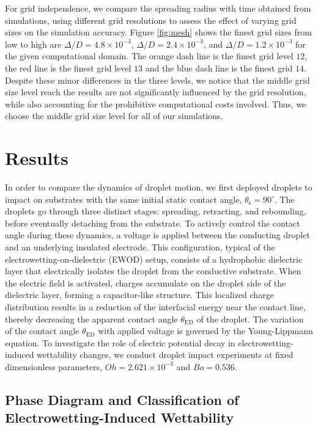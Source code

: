 \documentclass[lineno]{cls/jfm}
\begin{document}
For grid independence, we compare the spreading radius with time obtained from simulations, using different grid resolutions to assess the effect of varying grid sizes on the simulation accuracy. Figure \ref{fig:mesh} shows the finest grid sizes from low to high are $\Delta/D = 4.8 \times 10^{-3}$, $\Delta/D = 2.4 \times 10^{-3}$, and $\Delta/D = 1.2 \times 10^{-3}$ for the given computational domain. The orange dash line is the finest grid level $12$, the red line is the finest grid level $13$ and the blue dash line is the finest grid $14$. Despite these minor differences in the three levels, we notice that the middle grid size level reach the results are not significantly influenced by the grid resolution, while also accounting for the prohibitive computational costs involved. Thus, we choose the middle grid size level for all of our simulations.

\section{Results}\label{sec:Results}

In order to compare the dynamics of droplet motion, we first deployed droplets to impact on substrates with the same initial static contact angle, $\theta_{\mathrm{s}} = 90^\circ$. The droplets go through three distinct stages: spreading, retracting, and rebounding, before eventually detaching from the substrate. To actively control the contact angle during these dynamics, a voltage is applied between the conducting droplet and an underlying insulated electrode. This configuration, typical of the electrowetting-on-dielectric (EWOD) setup, consists of a hydrophobic dielectric layer that electrically isolates the droplet from the conductive substrate. When the electric field is activated, charges accumulate on the droplet side of the dielectric layer, forming a capacitor-like structure. This localized charge distribution results in a reduction of the interfacial energy near the contact line, thereby decreasing the apparent contact angle $\theta_{\mathrm{ED}}$ of the droplet. The variation of the contact angle $\theta_{\mathrm{ED}}$ with applied voltage is governed by the Young-Lippmann equation. To investigate the role of electric potential decay in electrowetting-induced wettability changes, we conduct droplet impact experiments at fixed dimensionless parameters, $Oh = 2.621 \times 10^{-3}$ and $Bo = 0.536$.

\subsection{Phase Diagram and Classification of Electrowetting-Induced Wettability}
\end{document}
